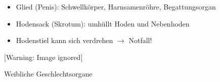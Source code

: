\documentclass{article}
\begin{document}
\begin{itemize}
\item {\mdseries
Glied (Penis): Schwellk\"orper, Harnsamenr\"ohre, Begattungsorgan}

\item {\mdseries
Hodensack (Skrotum): umh\"ullt Hoden und Nebenhoden}

\end{itemize}
\begin{itemize}
\item {\mdseries
Hodenstiel kann sich verdrehen ${\rightarrow}$ Notfall!}

\end{itemize}
  [Warning: Image ignored] %
 

{\mdseries\color[rgb]{0.0,0.0,0.5019608}
Weibliche Geschlechtsorgane}
\end{document}
